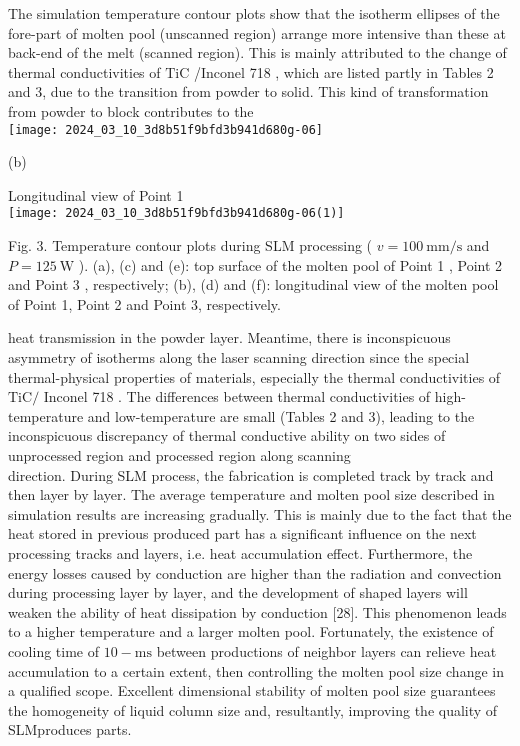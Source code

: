 \documentclass[10pt]{article}
\begin{document}
The simulation temperature contour plots show that the isotherm ellipses of the fore-part of molten pool (unscanned region) arrange more intensive than these at back-end of the melt (scanned region). This is mainly attributed to the change of thermal conductivities of $\mathrm{TiC}$ /Inconel 718 , which are listed partly in Tables 2 and 3, due to the transition from powder to solid. This kind of transformation from powder to block contributes to the\\
\texttt{[image: 2024\_03\_10\_3d8b51f9bfd3b941d680g-06]}

(b)

Longitudinal view of Point 1\\
\texttt{[image: 2024\_03\_10\_3d8b51f9bfd3b941d680g-06(1)]}

Fig. 3. Temperature contour plots during SLM processing ( $v=100 \mathrm{~mm} / \mathrm{s}$ and $P=125 \mathrm{~W}$ ). (a), (c) and (e): top surface of the molten pool of Point 1 , Point 2 and Point 3 , respectively; (b), (d) and (f): longitudinal view of the molten pool of Point 1, Point 2 and Point 3, respectively.

heat transmission in the powder layer. Meantime, there is inconspicuous asymmetry of isotherms along the laser scanning direction since the special thermal-physical properties of materials, especially the thermal conductivities of $\mathrm{TiC} /$ Inconel 718 . The differences between thermal conductivities of high-temperature and low-temperature are small (Tables 2 and 3), leading to the inconspicuous discrepancy of thermal conductive ability on two sides of unprocessed region and processed region along scanning\\
direction. During SLM process, the fabrication is completed track by track and then layer by layer. The average temperature and molten pool size described in simulation results are increasing gradually. This is mainly due to the fact that the heat stored in previous produced part has a significant influence on the next processing tracks and layers, i.e. heat accumulation effect. Furthermore, the energy losses caused by conduction are higher than the radiation and convection during processing layer by layer, and the development of shaped layers will weaken the ability of heat dissipation by conduction [28]. This phenomenon leads to a higher temperature and a larger molten pool. Fortunately, the existence of cooling time of $10-\mathrm{ms}$ between productions of neighbor layers can relieve heat accumulation to a certain extent, then controlling the molten pool size change in a qualified scope. Excellent dimensional stability of molten pool size guarantees the homogeneity of liquid column size and, resultantly, improving the quality of SLMproduces parts.
\end{document}
